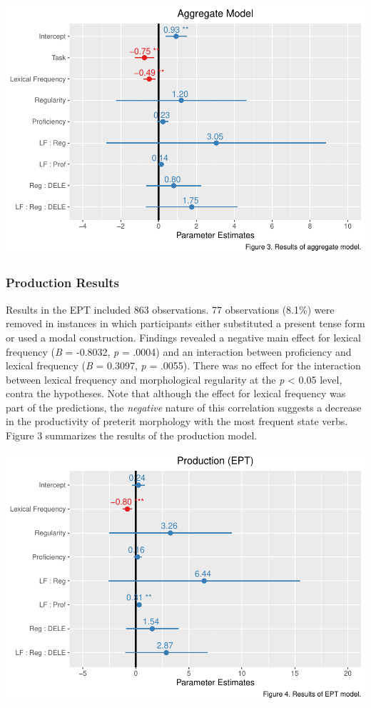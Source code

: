 \documentclass[
  english,
  man,floatsintext]{apa6}
\begin{document}
\includegraphics{Final-Manuscript_files/figure-latex/aggregate-model-1.pdf}

\hypertarget{production-results}{%
\subsubsection{Production Results}\label{production-results}}

Results in the EPT included 863 observations. 77 observations (8.1\%) were removed in instances in which participants either substituted a present tense form or used a modal construction. Findings revealed a negative main effect for lexical frequency (\emph{B} = -0.8032, \emph{p} = .0004) and an interaction between proficiency and lexical frequency (\emph{B} = 0.3097, \emph{p} = .0055). There was no effect for the interaction between lexical frequency and morphological regularity at the \emph{p} \textless{} 0.05 level, contra the hypotheses. Note that although the effect for lexical frequency was part of the predictions, the \emph{negative} nature of this correlation suggests a decrease in the productivity of preterit morphology with the most frequent state verbs. Figure 3 summarizes the results of the production model.

\includegraphics{Final-Manuscript_files/figure-latex/HB-EPT-model-1.pdf}
\end{document}
